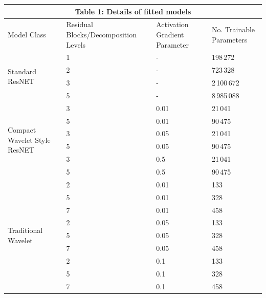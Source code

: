 \documentclass[9pt,conference]{IEEEtran}
\begin{document}
\begin{center}
    \begin{tabular}{ |p{3cm}||p{3cm}|p{3cm}|p{3cm}|  }
     \hline
     \multicolumn{4}{|c|}{Table 1: Details of fitted models} \\
     \hline
     Model Class& Residual Blocks/Decomposition Levels & Activation Gradient Parameter & No. Trainable Parameters \\
     \hline
     \multirow{4}{4em}{Standard ResNET}  & 1   & - & 198\,272 \\
                                        &   2  & -& 723\,328   \\
                                        & 3 & -& 2\,100\,672\\
                                        & 5 & - & 8\,985\,088\\ 
      \hline
      \multirow{6}{4em}{Compact Wavelet Style ResNET}  
                                        & 3 &  0.01 & 21\,041\\
                                        & 5 & 0.01 & 90\,475 \\
                                        & 3 &  0.05 & 21\,041 \\
                                        & 5 & 0.05 & 90\,475\\
                                        & 3 & 0.5 & 21\,041 \\
                                        & 5 & 0.5 & 90\,475\\
        \hline
        \multirow{9}{4em}{Traditional Wavelet}  
                                        & 2 &  0.01 & 133\\
                                        & 5 & 0.01 & 328 \\
                                        & 7 &  0.01 & 458 \\
                                        & 2 &  0.05 & 133\\
                                        & 5 & 0.05 & 328 \\
                                        & 7 &  0.05 & 458 \\
                                        & 2 &  0.1 & 133\\
                                        & 5 & 0.1 & 328 \\
                                        & 7 &  0.1 & 458 \\
                                     
        \hline


\end{tabular}
\end{center}
\end{document}
